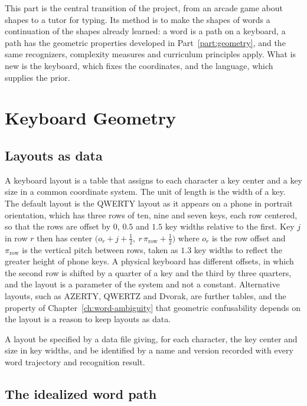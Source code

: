 This part is the central transition of the project, from an arcade game about shapes to a tutor for typing. Its method is to make the shapes of words a continuation of the shapes already learned: a word is a path on a keyboard, a path has the geometric properties developed in Part~\ref{part:geometry}, and the same recognizers, complexity measures and curriculum principles apply. What is new is the keyboard, which fixes the coordinates, and the language, which supplies the prior.

\chapter{Keyboard Geometry}\label{ch:keyboard-geometry}

\section{Layouts as data}

A keyboard layout is a table that assigns to each character a key center and a key size in a common coordinate system. The unit of length is the width of a key. The default layout is the QWERTY layout as it appears on a phone in portrait orientation, which has three rows of ten, nine and seven keys, each row centered, so that the rows are offset by $0$, $0.5$ and $1.5$ key widths relative to the first. Key $j$ in row $r$ then has center $\bigl(o_r+j+\tfrac12,\ r\,\pi_{\mathrm{row}}+\tfrac12\bigr)$ where $o_r$ is the row offset and $\pi_{\mathrm{row}}$ is the vertical pitch between rows, taken as $1.3$ key widths to reflect the greater height of phone keys. A physical keyboard has different offsets, in which the second row is shifted by a quarter of a key and the third by three quarters, and the layout is a parameter of the system and not a constant. Alternative layouts, such as AZERTY, QWERTZ and Dvorak, are further tables, and the property of Chapter~\ref{ch:word-ambiguity} that geometric confusability depends on the layout is a reason to keep layouts as data.

\begin{requirement}\label{req:layouts}
A layout \must{} be specified by a data file giving, for each character, the key center and size in key widths, and \must{} be identified by a name and version recorded with every word trajectory and recognition result.\evS
\end{requirement}

\section{The idealized word path}

